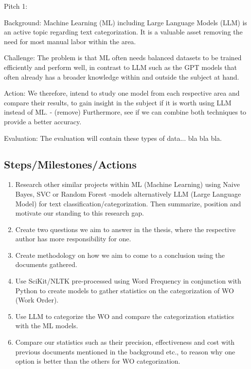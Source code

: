 \documentclass{article}
\begin{document}
Pitch 1:

Background:
Machine Learning (ML) including Large Language Models (LLM) is an active topic regarding text
categorization. It is a valuable asset removing the need for most manual labor within the area.

Challenge:
The problem is that ML often needs balanced datasets to be trained efficiently and perform well,
in contrast to LLM such as the GPT models that often already has a broader knowledge within and
outside the subject at hand.

Action:
We therefore, intend to study one model from each respective area and compare their results,
to gain insight in the subject if it is worth using LLM instead of ML.
- (remove) Furthermore, see if we can combine both techniques to provide a better accuracy.

Evaluation:
The evaluation will contain these types of data... bla bla bla.

\subsection{Steps/Milestones/Actions}

\begin{enumerate}
      \item Research other similar projects within ML (Machine Learning) using Naive Bayes,
            SVC or Random Forest -models alternatively LLM (Large Language Model) for text
            classification/categorization. Then summarize, position and motivate our standing to
            this research gap.
      \item Create two questions we aim to answer in the thesis, where the respective author
            has more responsibility for one.
      \item Create methodology on how we aim to come to a conclusion using the documents gathered.
      \item Use SciKit/NLTK pre-processed using Word Frequency in conjunction with Python
            to create models to gather statistics on the categorization of WO (Work Order).
      \item Use LLM to categorize the WO and compare the categorization statistics
            with the ML models.
      \item Compare our statistics such as their precision,
            effectiveness and cost with previous documents mentioned in the background etc.,
            to reason why one option is better than the others for WO categorization.
\end{enumerate}
\end{document}

